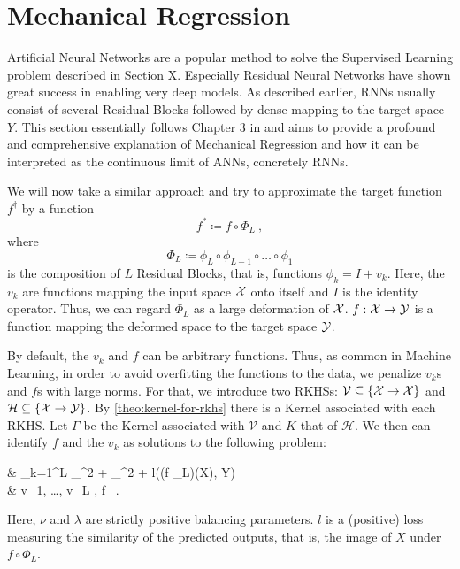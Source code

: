 \section{Mechanical Regression}

Artificial Neural Networks are a popular method to solve the Supervised Learning problem described in Section X.
Especially Residual Neural Networks have shown great success in enabling very deep models.
As described earlier, RNNs usually consist of several Residual Blocks followed by dense mapping to the target space $Y$.
This section essentially follows Chapter 3 in \cite{owhadi20} and aims to provide a profound and comprehensive explanation of Mechanical Regression and how it can be interpreted as the continuous limit of ANNs, concretely RNNs.



We will now take a similar approach and try to approximate the target function $f^\dagger$ by a function
\begin{equation}
	f^\ast \coloneqq f \circ \Phi_L \ ,
\end{equation}
where 
\begin{equation}
	\Phi_L \coloneqq \phi_L \circ \phi_{L-1} \circ \ldots \circ \phi_1
\end{equation} 
is the composition of $L$ Residual Blocks, that is, functions $\phi_k = I + v_k$.
Here, the $v_k$ are functions mapping the input space $\mathcal{X}$ onto itself and $I$ is the identity operator.
Thus, we can regard $\Phi_L$ as a large deformation of $\mathcal{X}$.
$f: \mathcal{X} \to \mathcal{Y}$ is a function mapping the deformed space to the target space $\mathcal{Y}$.

By default, the $v_k$ and $f$ can be arbitrary functions.
Thus, as common in Machine Learning, in order to avoid overfitting the functions to the data, we penalize $v_k$s and $f$s with large norms.
For that, we introduce two RKHSs:
$\mathcal{V} \subseteq \{\mathcal{X} \rightarrow \mathcal{X}\}$ and $\mathcal{H} \subseteq \{\mathcal{X} \rightarrow \mathcal{Y}\}$. 
By \cref{theo:kernel-for-rkhs} there is a Kernel associated with each RKHS.
Let $\Gamma$ be the Kernel associated with $\mathcal{V}$ and $K$ that of $\mathcal{H}$.
We then can identify $f$ and the $v_k$ as solutions to the following problem:
\begin{problem}
	\label{prob:min-v-f}
	\begin{cases}
		 & \nu \cdot {} \sum_{k=1}^{L} _^2
		+ \lambda {}_^2 
		+ l((f \circ \Phi_L)(X), Y) \\
		 & v_1, \ldots, v_L \in {}, f \in {} \ .
	\end{cases}
\end{problem}
Here, $\nu$ and $\lambda$ are strictly positive balancing parameters.
$l$ is a (positive) loss measuring the similarity of the predicted outputs, that is, the image of $X$ under $f \circ \Phi_L$.

